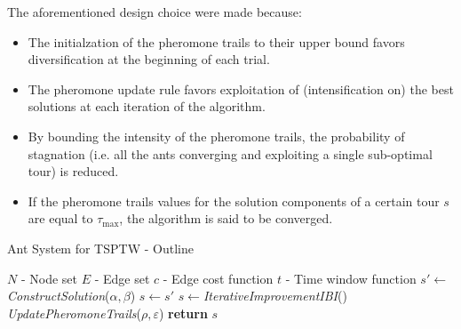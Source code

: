 \begin{homeworkProblem}
The aforementioned design choice were made because:

\begin{itemize}
    \item The initialzation of the pheromone trails to their upper bound favors diversification at the beginning of each trial.
    \item The pheromone update rule favors exploitation of (intensification on) the best solutions at each iteration of the algorithm.
    \item By bounding the intensity of the pheromone trails, the probability of stagnation (i.e. all the ants converging and exploiting a single sub-optimal tour) is reduced.
    \item If the pheromone trails values for the solution components of a certain tour $s$ are equal to $\tau_{\max}$, the algorithm is said to be converged.
  \end{itemize}
  

\begin{algorithm}[!h]
  \caption{\maxmin Ant System for TSPTW - Outline}\label{maxmintsptw}
  \begin{algorithmic}[1]
    \Require $N$ - Node set
    \Require $E$ - Edge set 
    \Require $c$ - Edge cost function
    \Require $t$ - Time window function
        \State $s' \gets$ \emph{ConstructSolution}($\alpha,\beta$)
          \State $s \gets s' $
        \EndIf 
      \EndFor
      \State $s \gets$\emph{IterativeImprovementIBI}()
      \State \emph{UpdatePheromoneTrails}($\rho,\varepsilon$)
    \EndWhile
    \State \textbf{return} $s$
    \State
  \EndProcedure
\end{algorithmic}
\end{algorithm}

\begin{center}
  
\begin{minipage}{.45\textwidth}
\centering
{}
\end{minipage}
\end{center}
\end{homeworkProblem}
